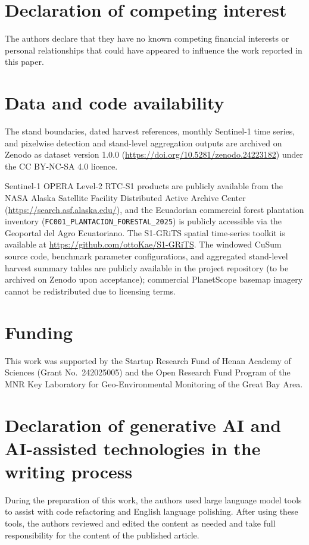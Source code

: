 \section*{Declaration of competing interest}
The authors declare that they have no known competing financial interests or personal relationships that could have appeared to influence the work reported in this paper.

\section*{Data and code availability}
The stand boundaries, dated harvest references, monthly Sentinel-1 time series, and pixelwise detection and stand-level aggregation outputs are archived on Zenodo as dataset version 1.0.0 (\url{https://doi.org/10.5281/zenodo.24223182}) under the CC BY-NC-SA 4.0 licence.

Sentinel-1 OPERA Level-2 RTC-S1 products are publicly available from the NASA Alaska Satellite Facility Distributed Active Archive Center (\url{https://search.asf.alaska.edu/}), and the Ecuadorian commercial forest plantation inventory (\texttt{FC001\_PLANTACION\_FORESTAL\_2025}) is publicly accessible via the Geoportal del Agro Ecuatoriano. The S1-GRiTS spatial time-series toolkit is available at \url{https://github.com/ottoKae/S1-GRiTS}. The windowed CuSum source code, benchmark parameter configurations, and aggregated stand-level harvest summary tables are publicly available in the project repository (to be archived on Zenodo upon acceptance); commercial PlanetScope basemap imagery cannot be redistributed due to licensing terms.

\section*{Funding}
This work was supported by the Startup Research Fund of Henan Academy of Sciences (Grant No.~242025005) and the Open Research Fund Program of the MNR Key Laboratory for Geo-Environmental Monitoring of the Great Bay Area.

\section*{Declaration of generative AI and AI-assisted technologies in the writing process}
During the preparation of this work, the authors used large language model tools to assist with code refactoring and English language polishing. After using these tools, the authors reviewed and edited the content as needed and take full responsibility for the content of the published article.
